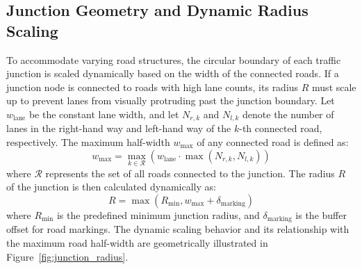 \documentclass[../report_main.tex]{subfiles}
\begin{document}
\subsection{Junction Geometry and Dynamic Radius Scaling}
To accommodate varying road structures, the circular boundary of each traffic junction is scaled dynamically based on the width of the connected roads. If a junction node is connected to roads with high lane counts, its radius $R$ must scale up to prevent lanes from visually protruding past the junction boundary.
Let $w_{\text{lane}}$ be the constant lane width, and let $N_{r, k}$ and $N_{l, k}$ denote the number of lanes in the right-hand way and left-hand way of the $k$-th connected road, respectively. The maximum half-width $w_{\max}$ of any connected road is defined as:
\begin{equation}
    w_{\max} = \max_{k \in \mathcal{R}} \left( w_{\text{lane}} \cdot \max(N_{r, k}, N_{l, k}) \right)
\end{equation}
where $\mathcal{R}$ represents the set of all roads connected to the junction. The radius $R$ of the junction is then calculated dynamically as:
\begin{equation}
    R = \max \left( R_{\min}, w_{\max} + \delta_{\text{marking}} \right)
\end{equation}
where $R_{\min}$ is the predefined minimum junction radius, and $\delta_{\text{marking}}$ is the buffer offset for road markings. The dynamic scaling behavior and its relationship with the maximum road half-width are geometrically illustrated in Figure~\ref{fig:junction_radius}.
\end{document}
